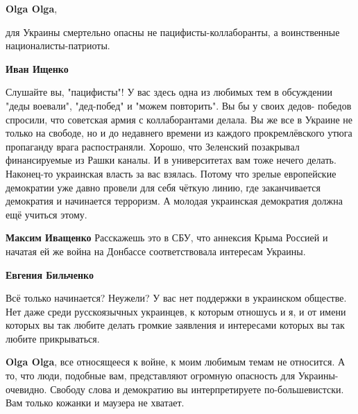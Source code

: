 \begin{itemize}
\begin{itemize}
\textbf{Olga Olga},

для Украины смертельно опасны не пацифисты-коллаборанты, а воинственные националисты-патриоты.

 
\textbf{Иван Ищенко} 

Слушайте вы, "пацифисты"! У вас здесь одна из любимых тем в обсуждении "деды
воевали", "дед-побед" и "можем повторить". Вы бы у своих дедов- победов
спросили, что советская армия с коллаборантами делала. Вы же все в Украине не
только на свободе, но и до недавнего времени из каждого прокремлёвского утюга
пропаганду врага распостраняли. Хорошо, что Зеленский позакрывал финансируемые
из Рашки каналы. И в университетах вам тоже нечего делать. Наконец-то
украинская власть за вас взялась. Потому что зрелые европейские демократии уже
давно провели для себя чёткую линию, где заканчивается демократия и начинается
терроризм. А молодая украинская демократия должна ещё учиться этому.

 
\textbf{Максим Иващенко} Расскажешь это в СБУ, что аннексия Крыма Россией и начатая ей же война на Донбассе соответствовала интересам Украины.🤣

 
\textbf{Евгения Бильченко} 

Всё только начинается? Неужели? У вас нет поддержки в украинском обществе. Нет
даже среди русскоязычных украинцев, к которым отношусь и я, и от имени которых
вы так любите делать громкие заявления и интересами которых вы так любите
прикрываться.

 
\textbf{Olga Olga}, все относящееся к войне, к моим любимым темам не относится.
А то, что люди, подобные вам, представляют огромную опасность для
Украины-очевидно. Свободу слова и демократию вы интерпретируете
по-большевистски. Вам только кожанки и маузера не хватает.



\end{itemize}
\end{itemize}
